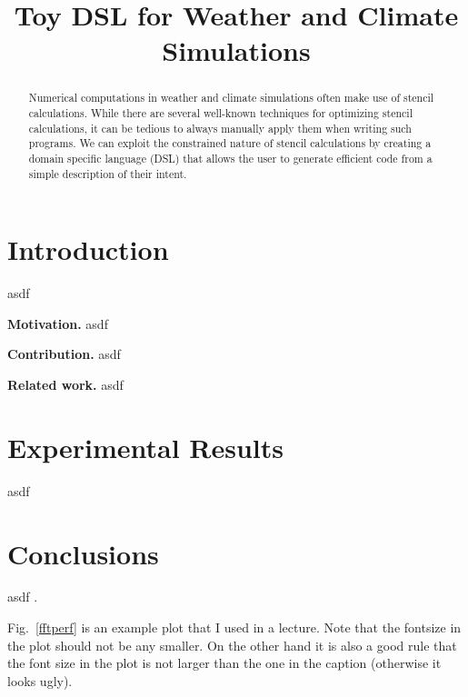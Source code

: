\documentclass{article}
\title{Toy DSL for Weather and Climate Simulations}
\newcommand{\mypar}[1]{{\bf #1.}}
\begin{document}
\maketitle

\begin{abstract}
Numerical computations in weather and climate simulations often make use of
stencil calculations. While there are several well-known techniques for
optimizing stencil calculations, it can be tedious to always manually apply
them when writing such programs. We can exploit the constrained nature of
stencil calculations by creating a domain specific language (DSL) that allows
the user to generate efficient code from a simple description of their intent.
\end{abstract}

\section{Introduction}\label{sec:intro}

asdf

\mypar{Motivation}
asdf

\mypar{Contribution}
asdf

\mypar{Related work}
asdf


\section{Experimental Results}\label{sec:exp}

asdf


\section{Conclusions}

asdf  \cite{Higham:98}.

Fig.~\ref{fftperf} is an example plot that I used in a lecture. Note that the fontsize in the plot should not be any smaller. On the other hand it is also a good rule that the font size in the plot is not larger than the one in the caption (otherwise it looks ugly).

\end{document}
